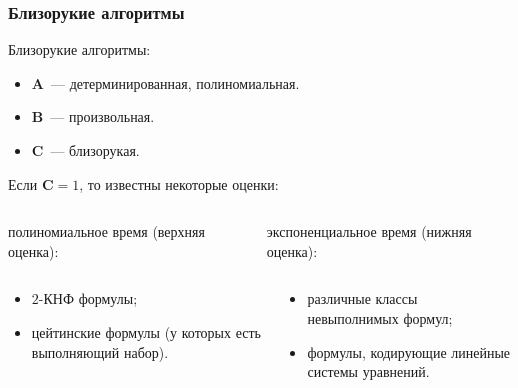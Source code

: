 \begin{frame}
    \frametitle{Близорукие алгоритмы}

    \pause

    \begin{definition}
		Близорукие алгоритмы:
        \begin{itemize}
            \pause
	        \item $\mathbf{A}$~--- детерминированная, полиномиальная.
            \pause
        	\item $\mathbf{B}$~--- произвольная.
        	\pause
        	\item $\mathbf{C}$~--- близорукая.
        \end{itemize}
	\end{definition}

    \pause
    Если $\mathbf{C} = 1$, то известны некоторые оценки: 

    \pause
    \begin{columns}
        \begin{column}{5cm}
            
            полиномиальное время (верхняя оценка):
        \end{column}
        \begin{column}{5cm}
            
            экспоненциальное время (нижняя оценка):
        \end{column}
    \end{columns}

    \pause
    \begin{columns}
        \begin{column}{5cm}
            \begin{itemize}
		 		\item $2$-КНФ формулы;
			    \pause
    			\item цейтинские формулы (у которых есть выполняющий
			        набор).
            \end{itemize}
        \end{column}
        \begin{column}{5cm}
            \begin{itemize}
	            \pause
    	        \item различные классы невыполнимых формул;
        		\pause
            	\item формулы, кодирующие линейные системы уравнений.
            \end{itemize}
        \end{column}
    \end{columns}
\end{frame}


